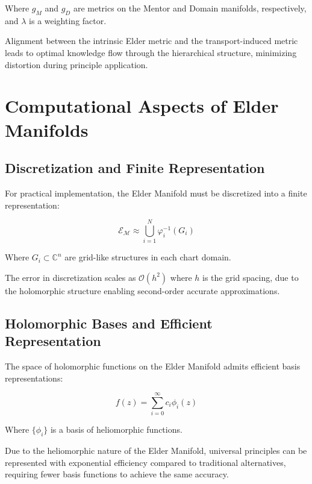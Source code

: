 Where $g_M$ and $g_D$ are metrics on the Mentor and Domain manifolds, respectively, and $\lambda$ is a weighting factor.

\begin{theorem}
Alignment between the intrinsic Elder metric and the transport-induced metric leads to optimal knowledge flow through the hierarchical structure, minimizing distortion during principle application.
\end{theorem}

\section{Computational Aspects of Elder Manifolds}

\subsection{Discretization and Finite Representation}

For practical implementation, the Elder Manifold must be discretized into a finite representation:

\begin{equation}
\mathcal{E}_{\mathcal{M}} \approx \bigcup_{i=1}^N \varphi_i^{-1}(G_i)
\end{equation}

Where $G_i \subset \mathbb{C}^n$ are grid-like structures in each chart domain.

\begin{proposition}
The error in discretization scales as $\mathcal{O}(h^2)$ where $h$ is the grid spacing, due to the holomorphic structure enabling second-order accurate approximations.
\end{proposition}

\subsection{Holomorphic Bases and Efficient Representation}

The space of holomorphic functions on the Elder Manifold admits efficient basis representations:

\begin{equation}
f(z) = \sum_{i=0}^{\infty} c_i \phi_i(z)
\end{equation}

Where $\{\phi_i\}$ is a basis of heliomorphic functions.

\begin{theorem}
Due to the heliomorphic nature of the Elder Manifold, universal principles can be represented with exponential efficiency compared to traditional alternatives, requiring fewer basis functions to achieve the same accuracy.
\end{theorem}

